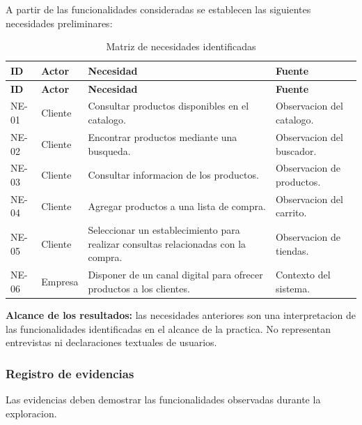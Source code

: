 \documentclass[12pt,a4paper]{article}
\begin{document}
A partir de las funcionalidades consideradas
se establecen las siguientes necesidades preliminares:

\begin{longtable}{|>{\raggedright\arraybackslash}p{1.45cm}|>{\raggedright\arraybackslash}p{2.7cm}|>{\raggedright\arraybackslash}p{6.6cm}|>{\raggedright\arraybackslash}p{3.4cm}|}
\caption{Matriz de necesidades identificadas}\\
\toprule
\textbf{ID} &
\textbf{Actor} &
\textbf{Necesidad} &
\textbf{Fuente} \\
\midrule
\endfirsthead

\toprule
\textbf{ID} &
\textbf{Actor} &
\textbf{Necesidad} &
\textbf{Fuente} \\
\midrule
\endhead

NE-01 &
Cliente &
Consultar productos disponibles en el catalogo. &
Observacion del catalogo. \\

NE-02 &
Cliente &
Encontrar productos mediante una busqueda. &
Observacion del buscador. \\

NE-03 &
Cliente &
Consultar informacion de los productos. &
Observacion de productos. \\

NE-04 &
Cliente &
Agregar productos a una lista de compra. &
Observacion del carrito. \\

NE-05 &
Cliente &
Seleccionar un establecimiento para realizar
consultas relacionadas con la compra. &
Observacion de tiendas. \\

NE-06 &
Empresa &
Disponer de un canal digital para ofrecer
productos a los clientes. &
Contexto del sistema. \\

\bottomrule
\end{longtable}

\textbf{Alcance de los resultados:}
las necesidades anteriores son una interpretacion
de las funcionalidades identificadas en el alcance
de la practica. No representan entrevistas ni
declaraciones textuales de usuarios.

\subsubsection{Registro de evidencias}

Las evidencias deben demostrar las funcionalidades
observadas durante la exploracion.
\end{document}
